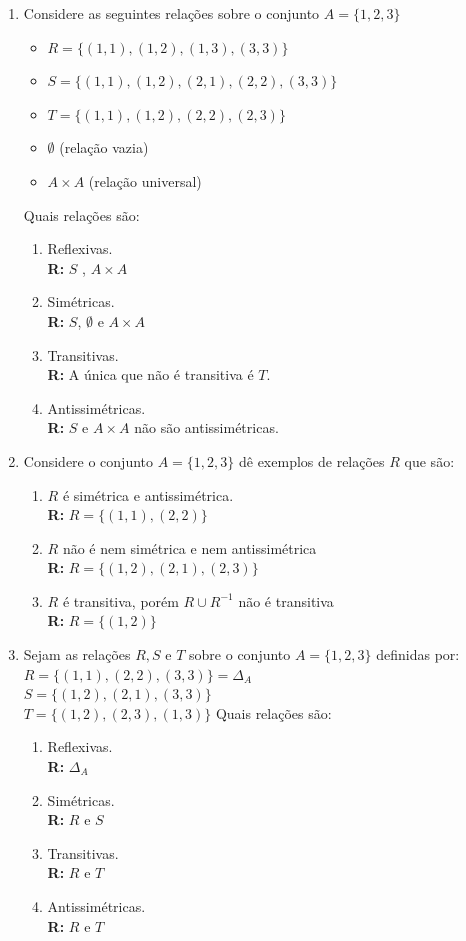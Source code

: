 \documentclass[oneside,a4paper,12pt]{article}
\begin{document}
\begin{enumerate}
	\item Considere as seguintes relações sobre o conjunto $A = \{ 1,2,3\}$
	\begin{multicols}{2}
		\begin{itemize}
			\item $R = \{ (1,1), (1,2), (1,3), (3,3)\}$
			\item $S = \{ (1,1), (1,2), (2,1), (2,2), (3,3) \}$
			\item $T = \{ (1,1), (1,2), (2,2), (2,3) \}$
			\item $\emptyset$ (relação vazia)
			\item $A \times A$ (relação universal)
		\end{itemize}
	\end{multicols}
	Quais relações são:
	\begin{enumerate}
		\item Reflexivas. \\ {\bf R:} $S$ , $A \times A$
		\item Simétricas. \\ {\bf R:} $S$, $\emptyset$ e $A \times A$
		\item Transitivas. \\ {\bf R:} A única que não é transitiva é $T$.
		\item Antissimétricas. \\ {\bf R:} $S$ e $A \times A$ não são antissimétricas.
	\end{enumerate}

	\item Considere o conjunto $A = \{1,2,3\}$ dê exemplos de relações $R$ que são:
	\begin{enumerate}
		\item $R$ é simétrica e antissimétrica. \\ {\bf R:} $R = \{ (1,1), (2,2)\}$
		\item $R$ não é nem simétrica e nem antissimétrica \\ {\bf R:} $R = \{ (1,2), (2,1), (2,3) \}$
		\item $R$ é transitiva, porém $R \cup R^{-1}$ não é transitiva \\ {\bf R:} $R = \{(1,2)\}$
	\end{enumerate}

	\item Sejam as relações $R,S$ e $T$ sobre o conjunto $A = \{ 1,2,3\}$ definidas por:\\ $R = \{ (1,1), (2,2), (3,3) \} = \Delta_{A}$ \\ $S = \{ (1,2), (2,1), (3,3) \}$ \\ $T = \{(1,2), (2,3), (1,3)\}$
	Quais relações são:
	\begin{enumerate}
		\item Reflexivas. \\ {\bf R:} $\Delta_{A}$
		\item Simétricas. \\ {\bf R:} $R$ e $S$
		\item Transitivas. \\ {\bf R:} $R$ e $T$
		\item Antissimétricas. \\ {\bf R:} $R$ e $T$
	\end{enumerate}
	

\end{enumerate}
\end{document}
